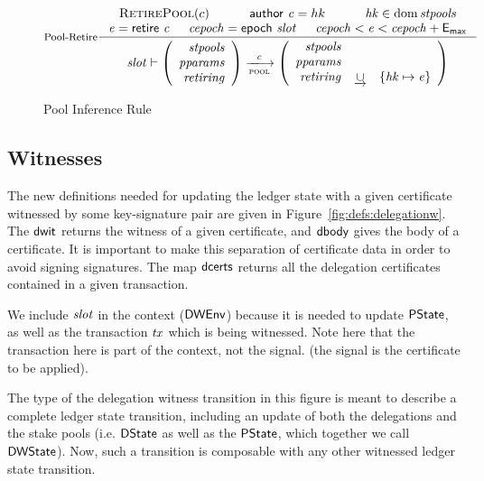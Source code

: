 \begin{figure}
  \begin{equation}\label{eq:pool-ret}
    \inference[Pool-Retire]
    {
    \RetirePool{c}
    & \cauthor{c} = hk
    & \var{hk} \in \dom \var{stpools} \\
    \var{e} = \retire{c}
    & \var{cepoch} = \epoch{slot}
    & \var{cepoch} < \var{e} < \var{cepoch} + \emax
  }
  {
    \var{slot} \vdash
    \left(
      \begin{array}{r}
        \var{stpools} \\
        \var{pparams} \\
        \var{retiring}
      \end{array}
    \right)
    \trans{pool}{c}
    \left(
      \begin{array}{rcl}
        \var{stpools} \\
        \var{pparams} \\
        \var{retiring} & \unionoverrideRight & \{\var{hk} \mapsto \var{e}\} \\
      \end{array}
    \right)
  }
  \end{equation}

  \caption{Pool Inference Rule}
  \label{fig:pool-rules}

\end{figure}

\subsection{Witnesses}
\label{sec:delegation-witnesses}


The new definitions needed for updating the ledger state with a given
certificate witnessed by some key-signature pair
are given in Figure~\ref{fig:defs:delegationw}. The $\mathsf{dwit}$ returns
the witness of a given certificate, and $\mathsf{dbody}$ gives the body of a
certificate. It is important to make this separation of certificate data
in order to avoid signing signatures. The map $\mathsf{dcerts}$ returns all
the delegation certificates contained in a given transaction.

We include $\mathit{slot}$ in the context ($\mathsf{DWEnv}$) because it is needed to update
$\mathsf{PState}$, as well as the transaction $\mathit{tx}$ which is being witnessed.
Note here that the transaction here is part of the context, not the signal.
(the signal is the certificate to be applied).

The type of the delegation witness
transition in this figure is meant to describe a complete ledger state
transition, including an update of both the delegations and the stake pools
(i.e. $\mathsf{DState}$ as well as the $\mathsf{PState}$, which together we call $\mathsf{DWState}$).
Now, such a transition is
composable with any other witnessed ledger state transition.

